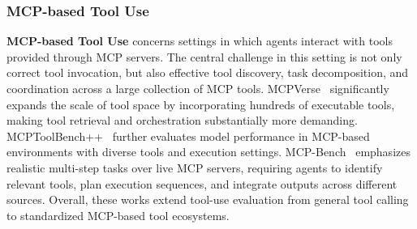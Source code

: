 \documentclass{llmxive}
\begin{document}
\subsubsection{MCP-based Tool Use}
\label{MCP-based Tool Use}
\textbf{MCP-based Tool Use} concerns settings in which agents interact with tools provided through MCP servers. The central challenge in this setting is not only correct tool invocation, but also effective tool discovery, task decomposition, and coordination across a large collection of MCP tools. MCPVerse~\cite{MCPVerse} significantly expands the scale of tool space by incorporating hundreds of executable tools, making tool retrieval and orchestration substantially more demanding. MCPToolBench++~\cite{MCPToolBench++} further evaluates model performance in MCP-based environments with diverse tools and execution settings. MCP-Bench~\cite{MCP-Bench} emphasizes realistic multi-step tasks over live MCP servers, requiring agents to identify relevant tools, plan execution sequences, and integrate outputs across different sources. Overall, these works extend tool-use evaluation from general tool calling to standardized MCP-based tool ecosystems.
\end{document}
